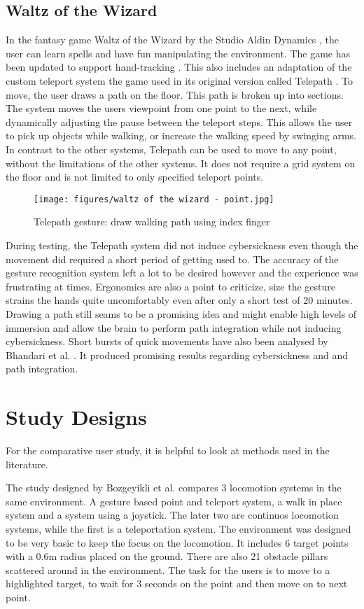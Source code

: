 \subsection{Waltz of the Wizard}
In the fantasy game Waltz of the Wizard \cite{WaWizOculus} by the Studio Aldin Dynamics \cite{Aladin}, the user can learn spells and have fun manipulating the environment. The game has been updated to support hand-tracking \cite{WaWizBlog}. This also includes an adaptation of the custom teleport system the game used in its original version called Telepath \cite{WaWizTelePath}. To move, the user draws a path on the floor. This path is broken up into sections. The system moves the users viewpoint from one point to the next, while dynamically adjusting the pause between the teleport steps. This allows the user to pick up objects while walking, or increase the walking speed by swinging arms. In contrast to the other systems, Telepath can be used to move to any point, without the limitations of the other systems. It does not require a grid system on the floor and is not limited to only specified teleport points.

\begin{figure}[hbt!]
  \centering
  \texttt{[image: figures/waltz of the wizard - point.jpg]}
  \caption{Telepath gesture: draw walking path using index finger}
  \label{fig:telepath}
\end{figure}

During testing, the Telepath system did not induce cybersickness even though the movement did required a short period of getting used to. The accuracy of the gesture recognition system left a lot to be desired however and the experience was frustrating at times. Ergonomics are also a point to criticize, size the gesture strains the hands quite uncomfortably even after only a short test of 20 minutes. Drawing a path still seams to be a promising idea and might enable high levels of immersion and allow the brain to perform path integration while not inducing cybersickness. Short bursts of quick movements have also been analysed by Bhandari et al. \cite{Bhandari}. It produced promising results regarding cybersickness and and path integration. 

\section{Study Designs}
For the comparative user study, it is helpful to look at methods used in the literature. 


The study designed by Bozgeyikli et al. \cite{bozgeyikli} compares 3 locomotion systems in the same environment. A gesture based point and teleport system, a walk in place system and a system using a joystick. The later two are continuos locomotion systems, while the first is a teleportation system. The environment was designed to be very basic to keep the focus on the locomotion. It includes 6 target points with a 0.6m radius placed on the ground. There are also 21 obstacle pillars scattered around in the environment. The task for the users is to move to a highlighted target, to wait for 3 seconds on the point and then move on to next point.

